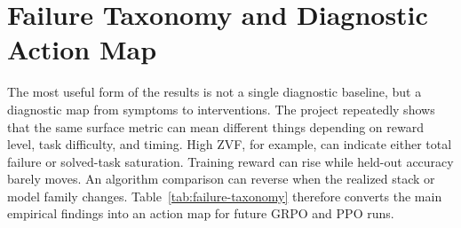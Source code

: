 \documentclass[12pt,a4paper]{report}
\begin{document}
\section{Failure Taxonomy and Diagnostic Action Map}
\label{sec:failure-taxonomy}

The most useful form of the results is not a single diagnostic baseline, but a diagnostic map from symptoms to interventions. The project repeatedly shows that the same surface metric can mean different things depending on reward level, task difficulty, and timing. High ZVF, for example, can indicate either total failure or solved-task saturation. Training reward can rise while held-out accuracy barely moves. An algorithm comparison can reverse when the realized stack or model family changes. Table~\ref{tab:failure-taxonomy} therefore converts the main empirical findings into an action map for future GRPO and PPO runs.
\end{document}
